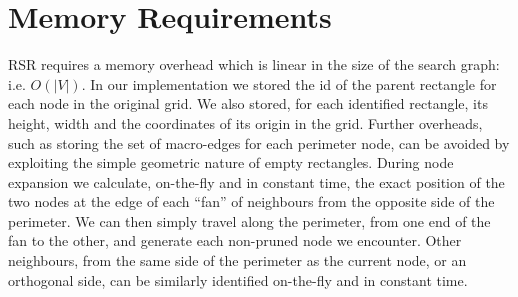 \section{Memory Requirements}
\label{sec:memory}
RSR requires a memory overhead which
is linear in the size of the search graph: i.e. $O(|V|)$.
In our implementation we stored the id of the parent rectangle for each node in 
the original grid. We also stored, for each identified rectangle, its height, width 
and the coordinates of its origin in the grid. 
Further overheads, such as storing the set of macro-edges for each perimeter
node, can be avoided by exploiting the simple geometric nature of empty
rectangles. 
During node expansion we calculate, on-the-fly and in constant time, the exact position of 
the two nodes at the edge of each ``fan'' of neighbours from the opposite side of the perimeter. 
We can then simply travel along the perimeter, from one end of
the fan to the other, and generate each non-pruned node we encounter.
Other neighbours, from the same side of the perimeter as the current node, or an orthogonal side, 
can be similarly identified on-the-fly and in constant time.
